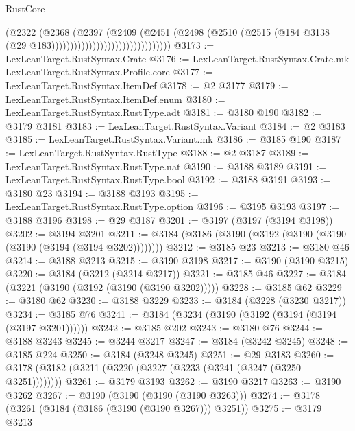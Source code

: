 \begin{lexlean}{RustCore}
\begin{coremodule}
                                                (@2322
                                                  (@2368
                                                    (@2397
                                                      (@2409
                                                        (@2451
                                                          (@2498
                                                            (@2510
                                                              (@2515
                                                                (@184
                                                                  @3138
                                                                  (@29
                                                                    @183))))))))))))))))))))))))))))))))
@3173 := LexLeanTarget.RustSyntax.Crate
@3176 := LexLeanTarget.RustSyntax.Crate.mk LexLeanTarget.RustSyntax.Profile.core
@3177 := LexLeanTarget.RustSyntax.ItemDef
@3178 := @2 @3177
@3179 := LexLeanTarget.RustSyntax.ItemDef.enum
@3180 := LexLeanTarget.RustSyntax.RustType.adt
@3181 := @3180 @190
@3182 := @3179 @3181
@3183 := LexLeanTarget.RustSyntax.Variant
@3184 := @2 @3183
@3185 := LexLeanTarget.RustSyntax.Variant.mk
@3186 := @3185 @190
@3187 := LexLeanTarget.RustSyntax.RustType
@3188 := @2 @3187
@3189 := LexLeanTarget.RustSyntax.RustType.nat
@3190 := @3188 @3189
@3191 := LexLeanTarget.RustSyntax.RustType.bool
@3192 := @3188 @3191
@3193 := @3180 @23
@3194 := @3188 @3193
@3195 := LexLeanTarget.RustSyntax.RustType.option
@3196 := @3195 @3193
@3197 := @3188 @3196
@3198 := @29 @3187
@3201 := @3197 (@3197 (@3194 @3198))
@3202 := @3194 @3201
@3211 := @3184 (@3186 (@3190 (@3192 (@3190 (@3190 (@3190 (@3194 (@3194 @3202))))))))
@3212 := @3185 @23
@3213 := @3180 @46
@3214 := @3188 @3213
@3215 := @3190 @3198
@3217 := @3190 (@3190 @3215)
@3220 := @3184 (@3212 (@3214 @3217))
@3221 := @3185 @46
@3227 := @3184 (@3221 (@3190 (@3192 (@3190 (@3190 @3202)))))
@3228 := @3185 @62
@3229 := @3180 @62
@3230 := @3188 @3229
@3233 := @3184 (@3228 (@3230 @3217))
@3234 := @3185 @76
@3241 := @3184 (@3234 (@3190 (@3192 (@3194 (@3194 (@3197 @3201))))))
@3242 := @3185 @202
@3243 := @3180 @76
@3244 := @3188 @3243
@3245 := @3244 @3217
@3247 := @3184 (@3242 @3245)
@3248 := @3185 @224
@3250 := @3184 (@3248 @3245)
@3251 := @29 @3183
@3260 := @3178 (@3182 (@3211 (@3220 (@3227 (@3233 (@3241 (@3247 (@3250 @3251))))))))
@3261 := @3179 @3193
@3262 := @3190 @3217
@3263 := @3190 @3262
@3267 := @3190 (@3190 (@3190 (@3190 @3263)))
@3274 := @3178 (@3261 (@3184 (@3186 (@3190 (@3190 @3267))) @3251))
@3275 := @3179 @3213

\end{coremodule}
\end{lexlean}
